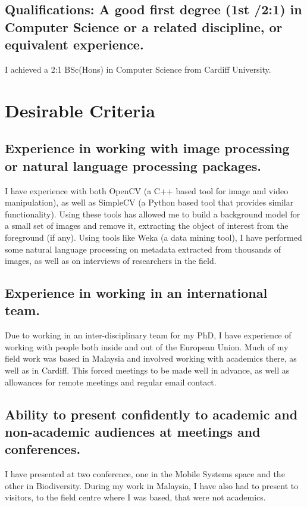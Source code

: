 \documentclass[10pt,a4paper]{article}
\begin{document}
\subsection{Qualifications: A good first degree (1st /2:1) in Computer Science or a related discipline, or equivalent experience.}
I achieved a 2:1 BSc(Hons) in Computer Science from Cardiff University.

\section{Desirable Criteria}
\subsection{Experience in working with image processing or natural language processing packages.}
I have experience with both OpenCV (a C++ based tool for image and video manipulation), as well as SimpleCV (a Python based tool that provides similar functionality). Using these tools has allowed me to build a background model for a small set of images and remove it, extracting the object of interest from the foreground (if any). 
Using tools like Weka (a data mining tool), I have performed some natural language processing on metadata extracted from thousands of images, as well as on interviews of researchers in the field.

\subsection{Experience in working in an international team.}
Due to working in an inter-disciplinary team for my PhD, I have experience of working with people both inside and out of the European Union. Much of my field work was based in Malaysia and involved working with academics there, as well as in Cardiff. This forced meetings to be made well in advance, as well as allowances for remote meetings and regular email contact.

\subsection{Ability to present confidently to academic and non-academic audiences at meetings and conferences.}
I have presented at two conference, one in the Mobile Systems space and the other in Biodiversity. During my work in Malaysia, I have also had to present to visitors, to the field centre where I was based, that were not academics.
\end{document}
